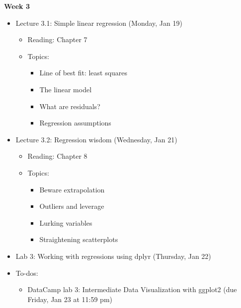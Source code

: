 \documentclass[11pt]{article}
\begin{document}
\textbf{Week 3}
\begin{itemize}
    \item Lecture 3.1: Simple linear regression (Monday, Jan 19)
    \begin{itemize}
        \item Reading: Chapter 7
        \item Topics:
        \begin{itemize}
            \item Line of best fit: least squares
            \item The linear model
            \item What are residuals?
            \item Regression assumptions
        \end{itemize}
    \end{itemize}
    \item Lecture 3.2: Regression wisdom (Wednesday, Jan 21)
    \begin{itemize}
        \item Reading: Chapter 8
        \item Topics:
        \begin{itemize}
            \item Beware extrapolation
            \item Outliers and leverage
            \item Lurking variables
            \item Straightening scatterplots
        \end{itemize}
    \end{itemize}
    \item Lab 3: Working with regressions using dplyr (Thursday, Jan 22)
    \item To-dos:
    \begin{itemize}
        \item DataCamp lab 3: Intermediate Data Visualization with ggplot2 (due Friday, Jan 23 at 11:59 pm)
    \end{itemize}
\end{itemize}
\end{document}
